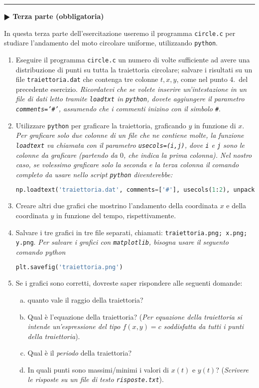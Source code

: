 \documentclass[11pt]{article}
\begin{document}
\hrule
\vspace{1mm}
\textbf{$\RHD$ Terza parte (obbligatoria)} 

In questa terza parte dell'esercitazione useremo il programma \texttt{circle.c} per
studiare l'andamento del moto circolare uniforme, utilizzando \texttt{python}.
\begin{enumerate}
\item Eseguire il programma \texttt{circle.c} un numero di volte sufficiente ad avere una distribuzione di punti su tutta la traiettoria circolare; salvare
  i risultati su un file \texttt{traiettoria.dat} che contenga tre colonne $t,x,y$, come nel punto 4.\ del precedente esercizio.
  {\em Ricordatevi che se volete inserire un'intestazione in un file di dati letto tramite \texttt{loadtxt} in \texttt{python}, dovete aggiungere il parametro \texttt{comments='\#'}, assumendo che i commenti inizino con il simbolo \texttt{\#}}.

\item Utilizzare \texttt{python} per graficare la traiettoria, graficando $y$ in funzione di $x$.
  {\em Per graficare solo due colonne di un file che ne contiene molte, la funzione \texttt{loadtext} va chiamata 
  con il parametro \texttt{usecols=(i,j)}, dove \lstinline!i! e \lstinline!j! sono le colonne da graficare (partendo da $0$, che indica la prima colonna). Nel nostro caso, se volessimo graficare solo la seconda e la terza colonna il comando completo da usare nello script \texttt{python} diventerebbe:\/} \\
  \begin{lstlisting}[language=Python,numbers=none]
  np.loadtext('traiettoria.dat', comments=['#'], usecols(1:2), unpack=True)
\end{lstlisting}
\item 
  Creare altri due grafici che mostrino l'andamento della coordinata $x$ e della coordinata $y$ in funzione del tempo, rispettivamente.
\item Salvare i tre grafici in tre file separati, chiamati: \texttt{traiettoria.png; x.png; y.png}.
  {\em Per salvare i grafici con \texttt{matplotlib}, bisogna usare il seguento comando python\/}
\begin{lstlisting}[language=Python,numbers=none]
     plt.savefig('traiettoria.png')
\end{lstlisting}

\item Se i grafici sono corretti, dovreste saper rispondere alle seguenti domande:
\begin{enumerate}[(a)]
\item quanto vale il raggio della traiettoria? 
\item Qual \`e l'equazione della traiettoria? ({\em Per equazione della
  traiettoria si intende un'espressione del tipo $f(x,y)=c$ soddisfatta da tutti i punti della traiettoria\/}). 
\item Qual \`e il {\em periodo\/} della traiettoria? 
\item In quali punti sono massimi/minimi i valori di $x(t)$ e $y(t)$? ({\em Scrivere le risposte su un file di testo \texttt{risposte.txt}\/}).
\end{enumerate}
\end{enumerate}
\end{document}

